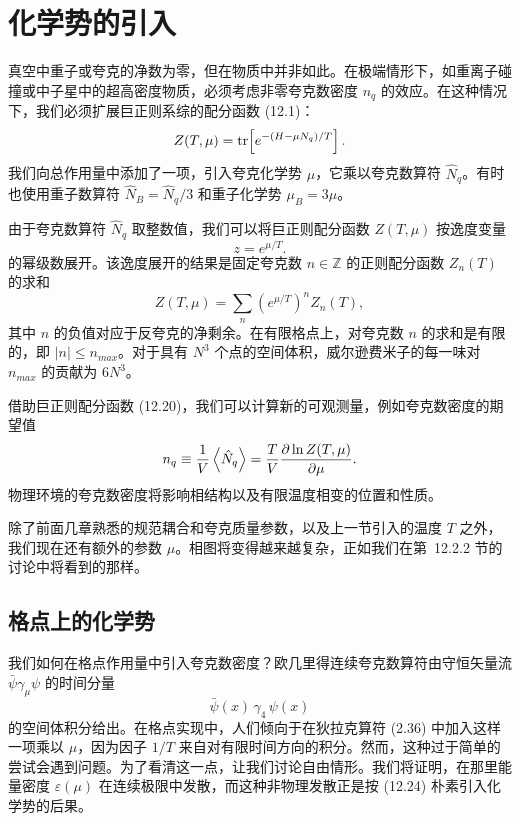 \section{化学势的引入}

真空中重子或夸克的净数为零，但在物质中并非如此。在极端情形下，如重离子碰撞或中子星中的超高密度物质，必须考虑非零夸克数密度 $n_q$ 的效应。在这种情况下，我们必须扩展巨正则系综的配分函数 (12.1)：
\begin{equation}
  Z(T,\mu) = \operatorname{tr}\!\left[e^{-(H - \mu N_q)/T}\right].
\end{equation}
我们向总作用量中添加了一项，引入夸克化学势 $\mu$，它乘以夸克数算符 $\hat{N}_q$。有时也使用重子数算符 $\hat{N}_B = \hat{N}_q/3$ 和重子化学势 $\mu_B = 3\mu$。

由于夸克数算符 $\hat{N}_q$ 取整数值，我们可以将巨正则配分函数 $Z(T,\mu)$ 按逸度变量
\begin{equation}
  z = e^{\mu/T}.
\end{equation}
的幂级数展开。该逸度展开的结果是固定夸克数 $n \in \mathbb{Z}$ 的正则配分函数 $Z_n(T)$ 的求和
\begin{equation}
  Z(T,\mu) = \sum_n \left(e^{\mu/T}\right)^n Z_n(T),
\end{equation}
其中 $n$ 的负值对应于反夸克的净剩余。在有限格点上，对夸克数 $n$ 的求和是有限的，即 $|n| \le n_{max}$。对于具有 $N^3$ 个点的空间体积，威尔逊费米子的每一味对 $n_{max}$ 的贡献为 $6N^3$。

借助巨正则配分函数 (12.20)，我们可以计算新的可观测量，例如夸克数密度的期望值
\begin{equation}
  n_q \equiv \frac{1}{V}\left\langle \hat{N}_q \right\rangle
    = \frac{T}{V}\frac{\partial\ln Z(T,\mu)}{\partial\mu}.
\end{equation}
物理环境的夸克数密度将影响相结构以及有限温度相变的位置和性质。

除了前面几章熟悉的规范耦合和夸克质量参数，以及上一节引入的温度 $T$ 之外，我们现在还有额外的参数 $\mu$。相图将变得越来越复杂，正如我们在第~12.2.2 节的讨论中将看到的那样。

\subsection{格点上的化学势}

我们如何在格点作用量中引入夸克数密度？欧几里得连续夸克数算符由守恒矢量流 $\bar{\psi}\gamma_\mu\psi$ 的时间分量
\begin{equation}
  \bar{\psi}(x)\,\gamma_4\,\psi(x)
\end{equation}
的空间体积分给出。在格点实现中，人们倾向于在狄拉克算符 (2.36) 中加入这样一项乘以 $\mu$，因为因子 $1/T$ 来自对有限时间方向的积分。然而，这种过于简单的尝试会遇到问题。为了看清这一点，让我们讨论自由情形。我们将证明，在那里能量密度 $\varepsilon(\mu)$ 在连续极限中发散，而这种非物理发散正是按 (12.24) 朴素引入化学势的后果。

